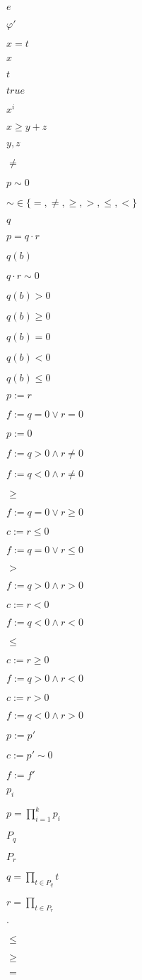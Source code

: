 \documentclass{article}
\begin{document}
$ e $
\pagebreak

$ \varphi' $
\pagebreak

$ x = t $
\pagebreak

$ x $
\pagebreak

$ t $
\pagebreak

$ true $
\pagebreak

$ x^i $
\pagebreak

$ x \geq y + z $
\pagebreak

$ y,z $
\pagebreak

$ \neq $
\pagebreak

$p \sim 0$
\pagebreak

$\sim \in \{ =, \neq, \geq, >, \leq, < \}$
\pagebreak

$q$
\pagebreak

$p = q \cdot r$
\pagebreak

$q(b)$
\pagebreak

$q \cdot r \sim 0$
\pagebreak

$q(b) > 0$
\pagebreak

$q(b) \geq 0$
\pagebreak

$q(b) = 0$
\pagebreak

$q(b) < 0$
\pagebreak

$q(b) \leq 0$
\pagebreak

$p := r$
\pagebreak

$f := q=0 \vee r=0$
\pagebreak

$p := 0$
\pagebreak

$f := q>0 \wedge r \neq 0$
\pagebreak

$f := q<0 \wedge r \neq 0$
\pagebreak

$\geq$
\pagebreak

$f := q=0 \vee r \geq 0$
\pagebreak

$c := r \leq 0$
\pagebreak

$f := q=0 \vee r \leq 0$
\pagebreak

$>$
\pagebreak

$f := q>0 \wedge r>0$
\pagebreak

$c := r<0$
\pagebreak

$f := q<0 \wedge r<0$
\pagebreak

$\leq$
\pagebreak

$c := r \geq 0$
\pagebreak

$f := q>0 \wedge r<0$
\pagebreak

$c := r>0$
\pagebreak

$f := q<0 \wedge r>0$
\pagebreak

$p := p'$
\pagebreak

$c := p' \sim 0$
\pagebreak

$f := f'$
\pagebreak

$p_i$
\pagebreak

$p = \prod_{i=1}^k p_i$
\pagebreak

$P_q$
\pagebreak

$P_r$
\pagebreak

$q = \prod_{t \in P_q} t$
\pagebreak

$r = \prod_{t \in P_r}$
\pagebreak

$\cdot$
\pagebreak

$ \leq $
\pagebreak

$ \geq $
\pagebreak

$ = $
\pagebreak
\end{document}
